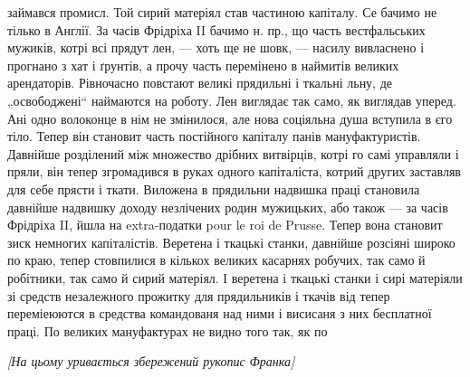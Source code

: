 займався промисл. Той сирий матеріял став частиною 
капіталу. Се бачимо не тілько в Англії. За часів
Фрідріха II бачимо н. пр., що часть вестфальських мужиків,
котрі всі прядут лен, — хоть ще не шовк, — насилу
вивласнено і прогнано з хат і ґрунтів, а прочу часть перемінено
в наймитів великих арендаторів. Рівночасно повстают
великі прядильні і ткальні льну, де „освободжені“ наймаются
на роботу. Лен виглядає так само, як виглядав уперед.
Ані одно волоконце в нім не змінилося, але нова соціяльна
душа вступила в єго тіло. Тепер він становит часть постійного
капіталу панів мануфактуристів. Давнійше розділений
між множество дрібних витвірців, котрі го самі управляли
і пряли, він тепер згромадився в руках одного капіталіста,
котрий других заставляв для себе прясти і ткати. Виложена
в прядильни надвишка праці становила давнійше надвишку
доходу незлічених родин мужицьких, або також — за часів
Фрідріха II, йшла на extra-податки pour le roi de Prusse.
Тепер вона становит зиск немногих капіталістів. Веретена
і ткацькі станки, давнійше розсіяні широко по краю, тепер
стовпилися в кількох великих касарнях робучих, так само
й робітники, так само й сирий матеріял. І веретена і ткацькі
станки і сирі матеріяли зі средств незалежного прожитку
для прядильників і ткачів від тепер переміеюются в средства
командованя над ними і висисаня з них бесплатної
праці. По великих мануфактурах не видно того так, як по
\linebreak[4]
\makebox[\linewidth]{\dotfill}

\begin{center}
\emph{[На цьому уривається збережений рукопис Франка]}
\end{center}
